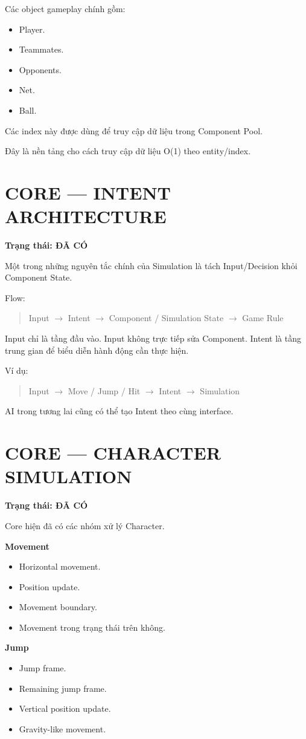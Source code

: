 \documentclass[12pt,a4paper]{article}
\newcommand{\flow}[1]{%
  \begin{quote}\centering\ttfamily #1\end{quote}%
}
\begin{document}
Các object gameplay chính gồm:
\begin{itemize}[nosep]
  \item Player.
  \item Teammates.
  \item Opponents.
  \item Net.
  \item Ball.
\end{itemize}

Các index này được dùng để truy cập dữ liệu trong Component Pool.

Đây là nền tảng cho cách truy cập dữ liệu O(1) theo entity/index.

\section{CORE --- INTENT ARCHITECTURE}
\textbf{Trạng thái: ĐÃ CÓ}

Một trong những nguyên tắc chính của Simulation là tách Input/Decision khỏi Component State.

Flow:

\flow{Input $\rightarrow$ Intent $\rightarrow$ Component / Simulation State $\rightarrow$ Game Rule}

Input chỉ là tầng đầu vào. Input không trực tiếp sửa Component. Intent là tầng trung gian để biểu diễn hành động cần thực hiện.

Ví dụ:

\flow{Input $\rightarrow$ Move / Jump / Hit $\rightarrow$ Intent $\rightarrow$ Simulation}

AI trong tương lai cũng có thể tạo Intent theo cùng interface.

\section{CORE --- CHARACTER SIMULATION}
\textbf{Trạng thái: ĐÃ CÓ}

Core hiện đã có các nhóm xử lý Character.

\textbf{Movement}
\begin{itemize}[nosep]
  \item Horizontal movement.
  \item Position update.
  \item Movement boundary.
  \item Movement trong trạng thái trên không.
\end{itemize}

\textbf{Jump}
\begin{itemize}[nosep]
  \item Jump frame.
  \item Remaining jump frame.
  \item Vertical position update.
  \item Gravity-like movement.
\end{itemize}
\end{document}
